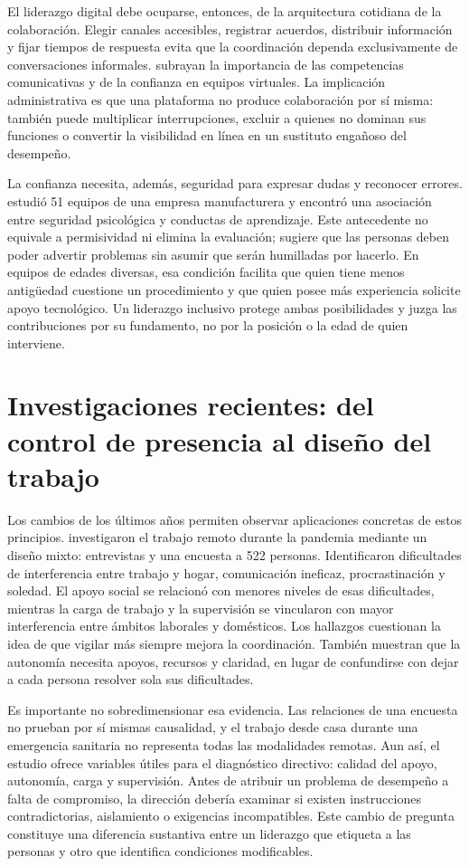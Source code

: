 \documentclass[12pt,letterpaper,oneside]{article}
\begin{document}
El liderazgo digital debe ocuparse, entonces, de la arquitectura cotidiana de la colaboración. Elegir canales accesibles, registrar acuerdos, distribuir información y fijar tiempos de respuesta evita que la coordinación dependa exclusivamente de conversaciones informales. \textcite{cortellazzo2019} subrayan la importancia de las competencias comunicativas y de la confianza en equipos virtuales. La implicación administrativa es que una plataforma no produce colaboración por sí misma: también puede multiplicar interrupciones, excluir a quienes no dominan sus funciones o convertir la visibilidad en línea en un sustituto engañoso del desempeño.

La confianza necesita, además, seguridad para expresar dudas y reconocer errores. \textcite{edmondson1999} estudió 51 equipos de una empresa manufacturera y encontró una asociación entre seguridad psicológica y conductas de aprendizaje. Este antecedente no equivale a permisividad ni elimina la evaluación; sugiere que las personas deben poder advertir problemas sin asumir que serán humilladas por hacerlo. En equipos de edades diversas, esa condición facilita que quien tiene menos antigüedad cuestione un procedimiento y que quien posee más experiencia solicite apoyo tecnológico. Un liderazgo inclusivo protege ambas posibilidades y juzga las contribuciones por su fundamento, no por la posición o la edad de quien interviene.

\section*{Investigaciones recientes: del control de presencia al diseño del trabajo}

Los cambios de los últimos años permiten observar aplicaciones concretas de estos principios. \textcite{wang2021} investigaron el trabajo remoto durante la pandemia mediante un diseño mixto: entrevistas y una encuesta a 522 personas. Identificaron dificultades de interferencia entre trabajo y hogar, comunicación ineficaz, procrastinación y soledad. El apoyo social se relacionó con menores niveles de esas dificultades, mientras la carga de trabajo y la supervisión se vincularon con mayor interferencia entre ámbitos laborales y domésticos. Los hallazgos cuestionan la idea de que vigilar más siempre mejora la coordinación. También muestran que la autonomía necesita apoyos, recursos y claridad, en lugar de confundirse con dejar a cada persona resolver sola sus dificultades.

Es importante no sobredimensionar esa evidencia. Las relaciones de una encuesta no prueban por sí mismas causalidad, y el trabajo desde casa durante una emergencia sanitaria no representa todas las modalidades remotas. Aun así, el estudio ofrece variables útiles para el diagnóstico directivo: calidad del apoyo, autonomía, carga y supervisión. Antes de atribuir un problema de desempeño a falta de compromiso, la dirección debería examinar si existen instrucciones contradictorias, aislamiento o exigencias incompatibles. Este cambio de pregunta constituye una diferencia sustantiva entre un liderazgo que etiqueta a las personas y otro que identifica condiciones modificables.
\end{document}
